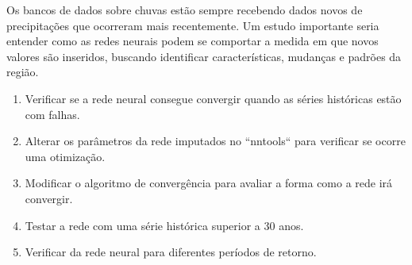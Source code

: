 Os bancos de dados sobre chuvas estão sempre recebendo dados novos de precipitações que ocorreram mais recentemente. Um estudo importante seria entender como as redes neurais podem se comportar a medida em que novos valores são inseridos, buscando identificar características, mudanças e padrões da região.

\begin{enumerate}
    \item Verificar se a rede neural consegue convergir quando as séries históricas estão com falhas.
    \item Alterar os parâmetros da rede imputados no ``nntools`` para verificar se ocorre uma otimização.
    \item Modificar o algoritmo de convergência para avaliar a forma como a rede irá convergir.
    \item Testar a rede com uma série histórica superior a 30 anos.
    \item Verificar da rede neural para diferentes períodos de retorno. 
\end{enumerate}